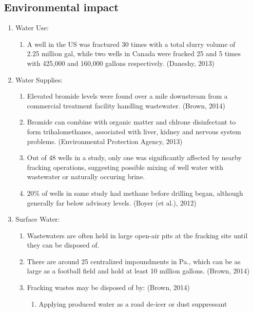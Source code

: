 \documentclass{article}
\begin{document}
  \subsection{Environmental impact}
    \begin{enumerate}
      \item Water Use:
        \begin{enumerate}
          \item A well in the US was fractured 30 times with a total slurry volume of 2.25 million gal, while two wells in Canada were fracked 25 and 5 times with 425,000 and 160,000 gallons respectively. (Daneshy, 2013) 
        \end{enumerate}
        
      \item Water Supplies:
        \begin{enumerate}
          \item Elevated bromide levels were found over a mile downstream from a commercial treatment facility handling wastewater. (Brown, 2014)
          \item Bromide can combine with organic matter and chlrone disinfectant to form trihalomethanes, associated with liver, kidney and nervous system problems. (Environmental Protection Agency, 2013)
          \item Out of 48 wells in a study, only one was significantly affected by nearby fracking operations, suggesting possible mixing of well water with wastewater or naturally occuring brine.
          \item 20\% of wells in same study had methane before drilling began, although generally far below advisory levels. (Boyer (et al.), 2012)
        \end{enumerate}
      \item Surface Water:
        \begin{enumerate}
          \item Wastewaters are often held in large open-air pits at the fracking site until they can be disposed of.
          \item There are around 25 centralized impoundments in Pa., which can be as large as a football field and hold at least 10 million gallons. (Brown, 2014)
          \item Fracking wastes may be disposed of by: (Brown, 2014)
             \begin{enumerate}
                \item Applying produced water as a road de-icer or dust suppressant

\end{enumerate}
\end{enumerate}
\end{enumerate}
\end{document}
